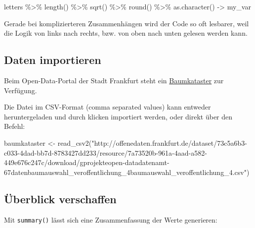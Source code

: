 \documentclass[11pt,german,a4paper]{article}
\newenvironment{Shaded}{\begin{snugshade}}{\end{snugshade}}
\newcommand{\FunctionTok}[1]{\textcolor[rgb]{0.00,0.00,0.00}{#1}}
\newcommand{\NormalTok}[1]{#1}
\newcommand{\OtherTok}[1]{\textcolor[rgb]{0.56,0.35,0.01}{#1}}
\newcommand{\SpecialCharTok}[1]{\textcolor[rgb]{0.00,0.00,0.00}{#1}}
\newcommand{\StringTok}[1]{\textcolor[rgb]{0.31,0.60,0.02}{#1}}
\begin{document}
\begin{Shaded}
\begin{Highlighting}[]
\NormalTok{letters }\SpecialCharTok{\%\textgreater{}\%}
  \FunctionTok{length}\NormalTok{() }\SpecialCharTok{\%\textgreater{}\%}
  \FunctionTok{sqrt}\NormalTok{() }\SpecialCharTok{\%\textgreater{}\%}
  \FunctionTok{round}\NormalTok{() }\SpecialCharTok{\%\textgreater{}\%}
  \FunctionTok{as.character}\NormalTok{() }\OtherTok{{-}\textgreater{}}
\NormalTok{  my\_var}
\end{Highlighting}
\end{Shaded}

Gerade bei komplizierteren Zusammenhängen wird der Code so oft lesbarer, weil die Logik von links nach rechts, bzw. von oben nach unten gelesen werden kann.

\hypertarget{daten-importieren}{%
\subsection{Daten importieren}\label{daten-importieren}}

Beim Open-Data-Portal der Stadt Frankfurt steht ein \href{http://offenedaten.frankfurt.de/dataset/baumkataster-frankfurt-am-main}{Baumkataster} zur Verfügung.

Die Datei im CSV-Format (comma separated values) kann entweder heruntergeladen und durch klicken importiert werden, oder direkt über den Befehl:

\begin{Shaded}
\begin{Highlighting}[]
\NormalTok{baumkataster }\OtherTok{\textless{}{-}} \FunctionTok{read\_csv2}\NormalTok{(}\StringTok{"http://offenedaten.frankfurt.de/dataset/73c5a6b3{-}c033{-}4dad{-}bb7d{-}8783427dd233/resource/7a73520b{-}961a{-}4aad{-}a582{-}449e676c247c/download/gprojekteopen{-}datadatenamt{-}67datenbaumauswahl\_veroffentlichung\_4baumauswahl\_veroffentlichung\_4.csv"}\NormalTok{)}
\end{Highlighting}
\end{Shaded}

\hypertarget{uxfcberblick-verschaffen}{%
\subsection{Überblick verschaffen}\label{uxfcberblick-verschaffen}}

Mit \texttt{summary()} lässt sich eine Zusammenfassung der Werte generieren:
\end{document}
